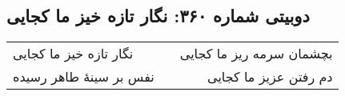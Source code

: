 \begin{center}
\section*{دوبیتی شماره ۳۶۰: نگار تازه خیز ما کجایی}
\label{sec:360}
\begin{longtable}{l p{0.5cm} r}
نگار تازه خیز ما کجایی
&&
بچشمان سرمه ریز ما کجایی
\\
نفس بر سینهٔ طاهر رسیده
&&
دم رفتن عزیز ما کجایی
\\
\end{longtable}
\end{center}
